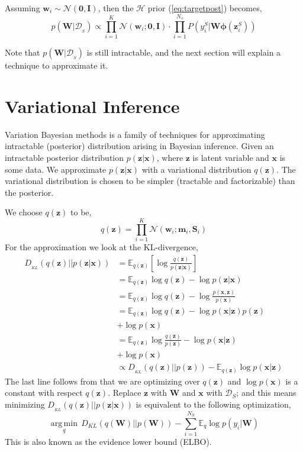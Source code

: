 \documentclass[10pt,twocolumn,letterpaper]{article}
\newcommand{\vect}[1]{\boldsymbol{\mathbf{#1}}}
\DeclareMathOperator*{\argmin}{arg\,min}
\begin{document}
Assuming \(\vect{w}_i \sim \mathcal{N}(\vect{0}, \vect{I})\), then the \(\mathcal{H}\) prior (\ref{eq:targetpost}) becomes,
    \begin{equation}
        p(\vect{W}|\mathcal{D}_{_{S}}) \propto \prod_{i=1}^{K}\mathcal{N}(\vect{w}_i ; \vect{0}, \vect{I}) \cdot \prod_{i=1}^{N_s} P(y_i^{S} | \vect{W \phi}(\vect{z}_i^{S}))
    \end{equation}
    
Note that \(p(\vect{W}|\mathcal{D}_{_{S}})\) is still intractable, and the next section will explain a technique to approximate it.

\section{Variational Inference}
Variation Bayesian methods is a family of techniques for approximating intractable (posterior) distribution arising in Bayesian inference. 
Given an intractable posterior distribution \(p(\vect{z}|\vect{x})\), where \(\vect{z}\) is latent variable and \(\vect{x}\) is some data.
We approximate \(p(\vect{z}|\vect{x})\) with a variational distribution \(q(\vect{z})\). The variational distribution is chosen to be simpler (tractable and factorizable) than the posterior. 

We choose \(q(\vect{z})\) to be,
\[
q(\vect{z}) = \prod_{i=1}^{K} \mathcal{N}(\vect{w}_i ; \vect{m}_i, \vect{S}_i)
\]
For the approximation we look at the KL-divergence,
\begin{align*}
    D_{_{KL}}(q(\vect{z}) || p(\vect{z} | \vect{x})) &= \mathbb{E}_{q(\vect{z})} \left[ \log \frac{q(\vect{z})}{p(\vect{z} | \vect{x})} \right] \\
    &= \mathbb{E}_{q(\vect{z})} \log q(\vect{z}) - \log p(\vect{z} | \vect{x}) \\
    &= \mathbb{E}_{q(\vect{z})} \log q(\vect{z}) - \log \frac{p(\vect{x}, \vect{z})}{p(\vect{x})} \\
    &= \mathbb{E}_{q(\vect{z})} \log q(\vect{z}) - \log p(\vect{x}|\vect{z}) p(\vect{z}) \\
    &+ \log p(\vect{x})\\
    &= \mathbb{E}_{q(\vect{z})} \log \frac{q(\vect{z})}{p(\vect{z})} - \log p(\vect{x}|\vect{z}) \\
    &+ \log p(\vect{x}) \\
    &\propto D_{_{KL}}(q(\vect{z}) || p(\vect{z})) - \mathbb{E}_{q(\vect{z})} \log p(\vect{x}|\vect{z})
\end{align*}
The last line follows from that we are optimizing over \(q(\vect{z})\) and \(\log p(\vect{x})\) is a constant with respect \(q(\vect{z})\). Replace \(\vect{z}\) with \(\vect{W}\) and \(\vect{x}\) with \(\mathcal{D}_S\); and this means minimizing \(D_{_{KL}}(q(\vect{z}) || p(\vect{z} | \vect{x}))\) is equivalent to the following optimization,
\begin{equation} \label{eq:ELBO}
    \underset{q}{\argmin} \, D_{KL} (q(\vect{W}) || p(\vect{W})) - \sum_{i=1}^{N_S} \mathbb{E}_{q} \log p(y_i|\vect{W})
\end{equation}
This is also known as the evidence lower bound (ELBO).
\end{document}
